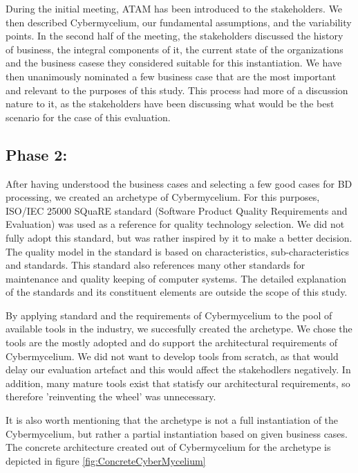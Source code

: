 \documentclass[review]{elsarticle}
\begin{document}
During the initial meeting, ATAM has been introduced to the stakeholders. We then described Cybermycelium, our fundamental assumptions, and the variability points. In the second half of the meeting, the stakeholders discussed the history of business, the integral components of it, the current state of the organizations and the business casese they considered suitable for this instantiation. We have then unanimously nominated a few business case that are the most important and relevant to the purposes of this study. This process had more of a discussion nature to it, as the stakeholders have been discussing what would be the best scenario for the case of this evaluation.

\subsection{Phase 2:}

After having understood the business cases and selecting a few good cases for BD processing, we created an archetype of Cybermycelium. For this purposes, ISO/IEC 25000 SQuaRE standard
(Software Product Quality Requirements and Evaluation) \cite{ISO25000} was used as a reference for quality technology selection. We did not fully adopt this standard, but was rather inspired by it to make a better decision. The quality model in the standard is based on characteristics, sub-characteristics and standards. This standard also references many other standards for maintenance and quality keeping of computer systems. The detailed explanation of the standards and its constituent elements are outside the scope of this study.

By applying standard and the requirements of Cybermycelium to the pool of available tools in the industry, we succesfully created the archetype. We chose the tools are the mostly adopted and do support the architectural requirements of Cybermycelium. We did not want to develop tools from scratch, as that would delay our evaluation artefact and this would affect the stakehodlers negatively. In addition, many mature tools exist that statisfy our architectural requirements, so therefore 'reinventing the wheel' was unnecessary.

It is also worth mentioning that the archetype is not a full instantiation of the Cybermycelium, but rather a partial instantiation based on given business cases. The concrete architecture created out of Cybermycelium for the archetype is depicted in figure \ref{fig:ConcreteCyberMycelium}
\end{document}
